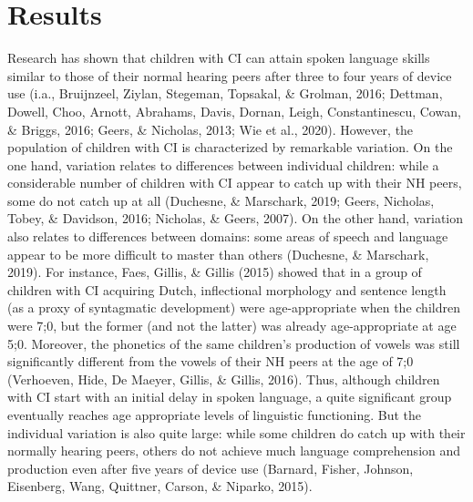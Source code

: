 \section{Results}
%
Research has shown that children with CI can attain spoken language skills similar to
those of their normal hearing peers after three to four years of device use (i.a., Bruijnzeel, Ziylan, Stegeman, Topsakal, \& Grolman, 2016; Dettman, Dowell, Choo, Arnott, Abrahams, Davis, Dornan, Leigh, Constantinescu, Cowan, \& Briggs, 2016; Geers, \& Nicholas,
2013; Wie et al., 2020). However, the population of children with CI is characterized by remarkable variation. On the one hand, variation relates to differences between individual children: while a considerable number of children with CI appear to catch up with their NH peers, some do not catch up at all (Duchesne, \& Marschark, 2019; Geers, Nicholas, Tobey, \& Davidson, 2016; Nicholas, \& Geers, 2007). On the other hand, variation also relates to differences between domains: some areas of speech and language appear to be more difficult to master than others (Duchesne, \& Marschark, 2019). For instance, Faes, Gillis, \& Gillis (2015) showed that in a group of children with CI acquiring Dutch, inflectional morphology and sentence length (as a proxy of syntagmatic development) were age-appropriate when the children were 7;0, but the former (and not the latter) was already age-appropriate at age 5;0. Moreover, the phonetics of the same children’s production of vowels was still significantly different from the vowels of their NH peers
at the age of 7;0 (Verhoeven, Hide, De Maeyer, Gillis, \& Gillis, 2016). Thus, although
children with CI start with an initial delay in spoken language, a quite significant group
eventually reaches age appropriate levels of linguistic functioning. But the individual
variation is also quite large: while some children do catch up with their normally hearing
peers, others do not achieve much language comprehension and production even after five years of device use (Barnard, Fisher, Johnson, Eisenberg, Wang, Quittner, Carson, \&
Niparko, 2015).




